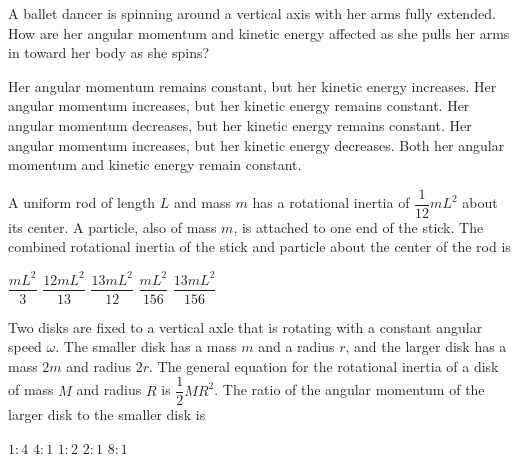 \documentclass{../../oss-apphys-exam}
\begin{document}
\begin{multicols*}{2}
\begin{questions}
    \question A ballet dancer is spinning around a vertical axis with her arms
    fully extended. How are her angular momentum and kinetic energy affected
    as she pulls her arms in toward her body as she spins?
    \begin{choices}
      \choice Her angular momentum remains constant, but her kinetic energy
      increases.
      \choice Her angular momentum increases, but her kinetic energy remains
      constant.
      \choice Her angular momentum decreases, but her kinetic energy remains
      constant.
      \choice Her angular momentum increases, but her kinetic energy decreases.
      \choice Both her angular momentum and kinetic energy remain constant.
    \end{choices}
    \vspace{.7in}
    
    \question A uniform rod of length $L$ and mass $m$ has a rotational inertia
    of $\dfrac1{12}mL^2$ about its center. A particle, also of mass $m$, is
    attached to one end of the stick. The combined rotational inertia of the
    stick and particle about the center of the rod is
    \begin{center}
    \end{center}
    \begin{choices}
      \choice$\dfrac{mL^2}3$
      \choice$\dfrac{12mL^2}{13}$
      \choice$\dfrac{13mL^2}{12}$
      \choice$\dfrac{mL^2}{156}$
      \choice$\dfrac{13mL^2}{156}$
    \end{choices}
    \columnbreak
    
    \question Two disks are fixed to a vertical axle that is rotating with a
    constant angular speed $\omega$. The smaller disk has a mass $m$ and a
    radius $r$, and the larger disk has a mass $2m$ and radius $2r$. The
    general equation for the rotational inertia of a disk of mass $M$ and
    radius $R$ is $\dfrac12MR^2$. The ratio of the angular momentum of the
    larger disk to the smaller disk is
    \begin{choices}
      \choice $1:4$
      \choice $4:1$
      \choice $1:2$
      \choice $2:1$
      \choice $8:1$
    \end{choices}


\end{questions}
\end{multicols*}
\end{document}
